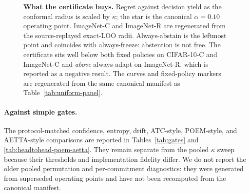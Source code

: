 \begin{figure}[t]\centering
{}
\caption{\textbf{What the certificate buys.} Regret against decision yield as the conformal radius
is scaled by $\kappa$; the star is the canonical $\alpha{=}0.10$ operating point. ImageNet-C and
ImageNet-R are regenerated from the source-replayed exact-LOO radii. Always-abstain is the leftmost point and coincides with always-freeze:
abstention is not free. The certificate sits well below both fixed policies on CIFAR-10-C and
ImageNet-C and \emph{above} always-adapt on ImageNet-R, which is reported as a negative result.
The curves and fixed-policy markers are regenerated from the same canonical manifest as
Table~\ref{tab:uniform-panel}.}
\label{fig:decision-frontier}
\end{figure}

\paragraph{Against simple gates.} The protocol-matched confidence, entropy, drift, ATC-style,
POEM-style, and AETTA-style comparisons are reported in Tables~\ref{tab:gates} and
\ref{tab:headtohead-poem-aetta}. They remain separate from the pooled $\kappa$ sweep because their
thresholds and implementation fidelity differ. We do not report the older pooled permutation and
per-commitment diagnostics: they were generated from superseded operating points and have not been
recomputed from the canonical manifest.

\iffalse
